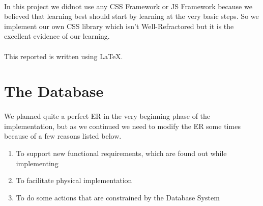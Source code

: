       \paragraph{}
        In this project we didnot use any CSS Framework or JS Framework because we believed that learning best should start by learning at the very basic steps.
        So we implement our own CSS library which isn't Well-Refractored but it is the excellent evidence of our learning.

      \paragraph{}
        This reported is written using \LaTeX.

    \section{The Database}
      \paragraph{}
        We planned quite a perfect ER in the very beginning phase of the implementation, but as we continued we need to modify the ER some times because of a few reasons listed below.
        \begin{enumerate}
          \item To support new functional requirements, which are found out while implementing
          \item To facilitate physical implementation
          \item To do some actions that are constrained by the Database System
        \end{enumerate}
